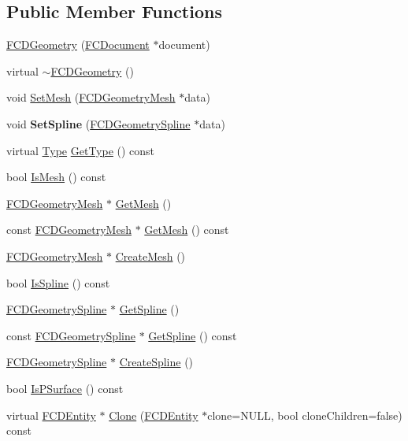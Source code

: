 \subsection*{Public Member Functions}
\begin{DoxyCompactItemize}
\item 
\hyperlink{classFCDGeometry_a99a0bad2b82d7829e289878cb5850af9}{FCDGeometry} (\hyperlink{classFCDocument}{FCDocument} $\ast$document)
\item 
virtual \hyperlink{classFCDGeometry_a060ee967dd962390502b8e46789f9882}{$\sim$FCDGeometry} ()
\item 
void \hyperlink{classFCDGeometry_a5ee6d764e3446b9380d9386c7524991d}{SetMesh} (\hyperlink{classFCDGeometryMesh}{FCDGeometryMesh} $\ast$data)
\item 
\hypertarget{classFCDGeometry_a184ceec81b8851a0b5fa06f9a4e11cdb}{
void {\bfseries SetSpline} (\hyperlink{classFCDGeometrySpline}{FCDGeometrySpline} $\ast$data)}
\label{classFCDGeometry_a184ceec81b8851a0b5fa06f9a4e11cdb}

\item 
virtual \hyperlink{classFCDEntity_a9301a4bd5f4d4190ec13e40db4effdd7}{Type} \hyperlink{classFCDGeometry_a220b50045d5a815dce0c1be69e06f926}{GetType} () const 
\item 
bool \hyperlink{classFCDGeometry_a2c8f918ca0734d57fc32f7b06ba2dcd1}{IsMesh} () const 
\item 
\hyperlink{classFCDGeometryMesh}{FCDGeometryMesh} $\ast$ \hyperlink{classFCDGeometry_acf98b948f99bb3f83cb6c09db05877b5}{GetMesh} ()
\item 
const \hyperlink{classFCDGeometryMesh}{FCDGeometryMesh} $\ast$ \hyperlink{classFCDGeometry_acf3bf2789cfb07effcf66b8fe74d1478}{GetMesh} () const 
\item 
\hyperlink{classFCDGeometryMesh}{FCDGeometryMesh} $\ast$ \hyperlink{classFCDGeometry_acce1627740e08dfd3b47fe0d42f9c3bb}{CreateMesh} ()
\item 
bool \hyperlink{classFCDGeometry_a939f0b6f72a6178fc38d8c09d2b4c5e2}{IsSpline} () const 
\item 
\hyperlink{classFCDGeometrySpline}{FCDGeometrySpline} $\ast$ \hyperlink{classFCDGeometry_ae0e0c4d96306a22cc89682058cbe95c0}{GetSpline} ()
\item 
const \hyperlink{classFCDGeometrySpline}{FCDGeometrySpline} $\ast$ \hyperlink{classFCDGeometry_a9054bad549b0e2e904210d8068b02792}{GetSpline} () const 
\item 
\hyperlink{classFCDGeometrySpline}{FCDGeometrySpline} $\ast$ \hyperlink{classFCDGeometry_a6f1df4bee113e6cce5cbb08b3c17e7ca}{CreateSpline} ()
\item 
bool \hyperlink{classFCDGeometry_a82d47e5b122836f234ff9f4e8a04bdc5}{IsPSurface} () const 
\item 
virtual \hyperlink{classFCDEntity}{FCDEntity} $\ast$ \hyperlink{classFCDGeometry_a676d04fa311bf75b20b22aa4c6211905}{Clone} (\hyperlink{classFCDEntity}{FCDEntity} $\ast$clone=NULL, bool cloneChildren=false) const 
\end{DoxyCompactItemize}


